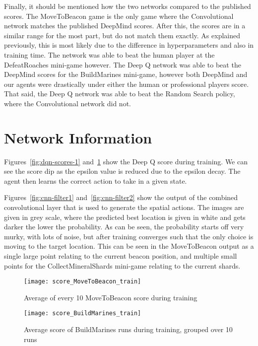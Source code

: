 Finally, it should be mentioned how the two networks compared to the published
scores. The MoveToBeacon game is the only game where the Convolutional network
matches the published DeepMind scores. After this, the scores are in a similar
range for the most part, but do not match them exactly. As explained previously,
this is most likely due to the difference in hyperparameters and also in
training time. The network was able to beat the human player at the
DefeatRoaches mini-game however. The Deep Q network was able to beat the
DeepMind scores for the BuildMarines mini-game, however both DeepMind and our
agents were drastically under either the human or professional players score.
That said, the Deep Q network was able to beat the Random Search policy, where
the Convolutional network did not.

\section{Network Information}

Figures~\ref{fig:dqn-scores-1} and~\ref{fig:dqn-scores-2} show the Deep Q score
during training. We can see the score dip as the epsilon value is reduced due to
the epsilon decay. The agent then learns the correct action to take in a given
state.

Figures~\ref{fig:cnn-filter1} and~\ref{fig:cnn-filter2} show the output of the
combined convolutional layer that is used to generate the spatial actions. The
images are given in grey scale, where the predicted best location is given in
white and gets darker the lower the probability. As can be seen, the
probability starts off very murky, with lots of noise, but after training
converges such that the only choice is moving to the target location. This can
be seen in the MoveToBeacon output as a single large point relating to the
current beacon position, and multiple small points for the CollectMineralShards
mini-game relating to the current shards.

\begin{figure}[h]
  \centering
  \begin{minipage}[b]{0.45\textwidth}
    \texttt{[image: score\_MoveToBeacon\_train]}
    \caption{Average of every 10 MoveToBeacon score during training}%
    \label{fig:dqn-scores-1}%
  \end{minipage}
  \hfill
  \begin{minipage}[b]{0.45\textwidth}
    \texttt{[image: score\_BuildMarines\_train]}
    \caption{Average score of BuildMarines runs during training, grouped over 10
    runs}%
    \label{fig:dqn-scores-2}
  \end{minipage}
\end{figure}

